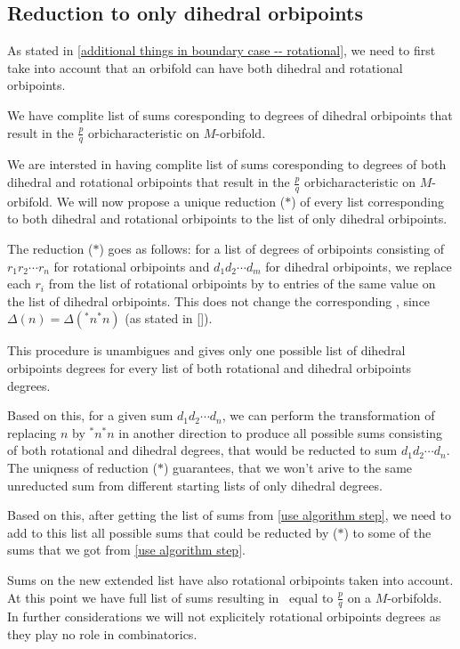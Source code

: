 \subsection{Reduction to only dihedral orbipoints}\label{reduction only to dihedral}
As stated in \ref{additional things in boundary case -- rotational}, we need to first 
take into account that an orbifold can have both dihedral and rotational orbipoints. 

We have complite list of sums coresponding to degrees of dihedral orbipoints that result in 
the $\frac{p}{q}$ orbicharacteristic on $M$-orbifold. 

We are intersted in having complite list of sums coresponding to degrees of both dihedral 
and rotational 
orbipoints that result in 
the $\frac{p}{q}$ orbicharacteristic on $M$-orbifold. 
We will now propose a unique  
reduction ($\ast$) of every list corresponding to both dihedral and 
rotational orbipoints to the list of only dihedral orbipoints. 

The reduction ($\ast$) goes as follows: for a list of degrees of orbipoints consisting of 
$r_1r_2\cdots r_n$ for rotational orbipoints and $d_1d_2\cdots d_m$ for dihedral orbipoints, 
we replace each $r_i$ from the list of rotational orbipoints by to entries of the same 
value on the list of dihedral orbipoints. This does not change the 
corresponding \Eoc, since $\Delta(n) = \Delta(^*n^*n)$ (as stated in \ref{}). 

This procedure is unambigues and gives only one possible list of dihedral orbipoints degrees 
for every list of both rotational and dihedral orbipoints degrees. 

Based on this, for a given sum $d_1d_2\cdots d_n$,
we can perform the transformation of replacing $n$ by $^*n^*n$ in another direction to 
produce all possible sums consisting of both rotational and dihedral degrees, that 
would be reducted to sum $d_1d_2\cdots d_n$. The uniqness of reduction ($\ast$) guarantees, that 
we won't arive to the same unreducted sum from different starting lists of only dihedral degrees.

Based on this, after getting the list of sums from \ref{use algorithm step}, we need to 
add to this list all possible sums that could be reducted by ($\ast$) to some 
of the sums that we got from \ref{use algorithm step}. 

Sums on the new extended list have also rotational orbipoints taken into account. 
At this point we have full list of sums resulting in \Eoc\ equal to $\frac{p}{q}$ on a 
$M$-orbifolds. 
In further considerations we will not explicitely rotational orbipoints degrees as they play 
no role in combinatorics.

